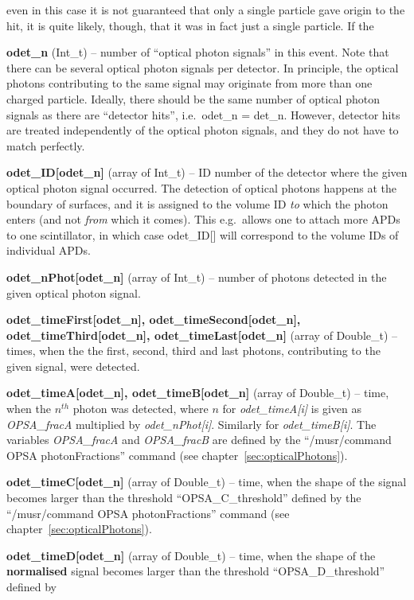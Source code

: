 \documentclass[twoside]{dis04}
\begin{document}
\begin{description}
        even in this case it is not guaranteed that only a single particle gave origin to the hit, it is quite likely, though, 
	that it was in fact just a single particle.  If the 
\item{\bf odet\_n} (Int\_t) -- number of ``optical photon signals'' in this event.  Note that there can be several optical photon signals
        per detector.  In principle, the optical photons contributing to the same signal may originate from more than
        one charged particle.  Ideally, there should be the same number of optical photon signals as there are 
	``detector hits'', i.e.\ odet\_n = det\_n.  However, detector hits are treated independently of the
	optical photon signals, and they do not have to match perfectly.
\item{\bf odet\_ID[odet\_n]} (array of Int\_t) -- ID number of the detector where the given optical photon signal occurred.
        The detection of optical photons happens at the boundary of surfaces, and it is assigned to the volume ID \emph{to} which
	the photon enters (and not \emph{from} which it comes).  This e.g.\ allows one to attach more APDs to one scintillator,
	in which case odet\_ID[] will correspond to the volume IDs of individual APDs.
\item{\bf odet\_nPhot[odet\_n]} (array of Int\_t) -- number of photons detected in the given optical photon signal.
\item{\bf odet\_timeFirst[odet\_n], odet\_timeSecond[odet\_n], odet\_timeThird[odet\_n], odet\_timeLast[odet\_n]} (array of Double\_t)
        -- times, when the the first, second, third and last photons, contributing to the given signal, were detected.
\item{\bf odet\_timeA[odet\_n], odet\_timeB[odet\_n]} (array of Double\_t)
        -- time, when the $n^{th}$ photon was detected, where $n$ for \emph{odet\_timeA[i]} is given as \emph{OPSA\_fracA} 
	multiplied by \emph{odet\_nPhot[i]}. Similarly for \emph{odet\_timeB[i]}.
	The variables \emph{OPSA\_fracA} and \emph{OPSA\_fracB} are defined by the ``/musr/command OPSA photonFractions'' command
	(see chapter~\ref{sec:opticalPhotons}).
\item{\bf odet\_timeC[odet\_n]} (array of Double\_t)
        -- time, when the shape of the signal becomes larger than the threshold ``OPSA\_C\_threshold'' defined by
	the ``/musr/command OPSA photonFractions'' command (see chapter~\ref{sec:opticalPhotons}).
\item{\bf odet\_timeD[odet\_n]} (array of Double\_t)
        -- time, when the shape of the {\bf normalised} signal becomes larger than the threshold ``OPSA\_D\_threshold'' defined by

\end{description}
\end{document}
